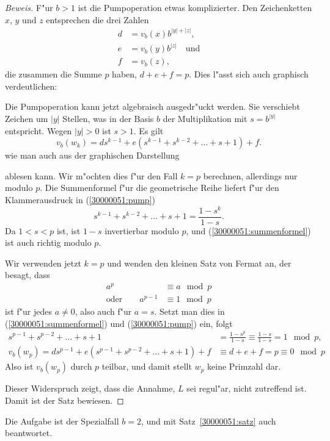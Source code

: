 \begin{loesung}
\begin{proof}[Beweis]
F"ur $b>1$ ist die Pumpoperation etwas komplizierter.
Den Zeichenketten $x$, $y$ und $z$ entsprechen die drei Zahlen
\begin{align*}
d&= v_b(x) b^{|y| + |z|},
\\
e&= v_b(y) b^{|z|} \quad\text{und}
\\
f&= v_b(z),
\end{align*}
die zusammen die Summe $p$ haben, $d+e+f=p$.
Dies l"asst sich auch graphisch verdeutlichen:
\begin{center}
\end{center}

Die Pumpoperation kann jetzt algebraisch ausgedr"uckt werden.
Sie verschiebt Zeichen um $|y|$ Stellen, was in der Basis $b$ der
Multiplikation mit $s=b^{|y|}$ entspricht.
Wegen $|y|>0$ ist $s>1$.
Es gilt
\begin{equation}
v_b(w_k)
=
ds^{k-1} + e(s^{k-1}+s^{k-2}+\dots+s+1) + f.
\label{30000051:pump}
\end{equation}
wie man auch aus der graphischen Darstellung
\begin{center}
\end{center}
ablesen kann.
Wir m"ochten dies f"ur den Fall $k=p$ berechnen, allerdings
nur modulo $p$.
Die Summenformel f"ur die geometrische Reihe liefert
f"ur den Klammerausdruck in (\ref{30000051:pump})
\begin{equation}
s^{k-1}+s^{k-2}+\dots+s+1 = \frac{1-s^k}{1-s}.
\label{30000051:summenformel}
\end{equation}
Da $1<s<p$ ist, ist $1-s$ invertierbar modulo $p$, und
(\ref{30000051:summenformel}) ist auch richtig modulo $p$. 

Wir verwenden jetzt $k=p$ und wenden den kleinen Satz von Fermat an,
der besagt, dass
\begin{align*}
a^p&\equiv a\mod p
\\
\text{oder}\qquad
a^{p-1}&\equiv 1\mod p
\end{align*}
ist f"ur jedes $a\ne 0$, also auch f"ur $a=s$.
Setzt man dies in (\ref{30000051:summenformel}) und (\ref{30000051:pump}) ein,
folgt
\begin{align*}
s^{p-1}+s^{p-2}+\dots+s+1
\phantom{)+f}
&=\frac{1-s^p}{1-s} \equiv \frac{1-s}{1-s}=1\mod p,
\\
v_b(w_p)
=
ds^{p-1} + e(s^{p-1}+s^{p-2}+\dots+s+1) + f
&\equiv
d+e+f = p\equiv 0 \mod p
\end{align*}
Also ist $v_b(w_p)$ durch $p$ teilbar, und damit stellt $w_p$ keine
Primzahl dar.

Dieser Widerspruch zeigt, dass die Annahme, $L$ sei regul"ar, nicht
zutreffend ist.
Damit ist der Satz bewiesen.
\renewcommand{\qedsymbol}{$\square$}
\end{proof}

Die Aufgabe ist der Spezialfall $b=2$, und mit Satz~\ref{30000051:satz}
auch beantwortet.
\end{loesung}
